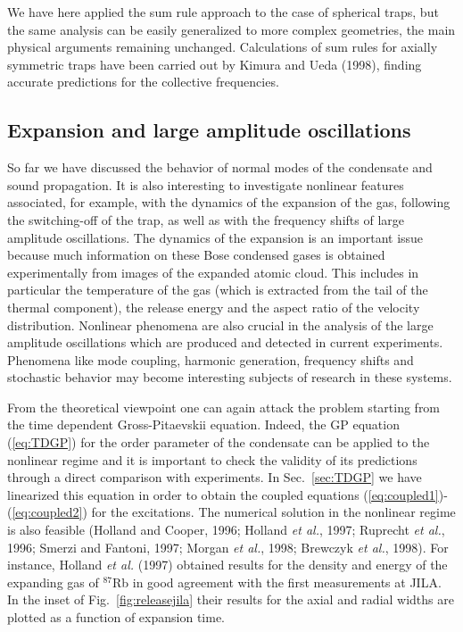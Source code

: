 We have here applied the sum rule approach to the case of spherical traps, 
but the same analysis can be easily generalized to more complex geometries, 
the main physical arguments remaining unchanged. Calculations of sum rules
for axially symmetric traps have been carried out by Kimura and Ueda (1998), 
finding accurate predictions for the collective frequencies.  


\subsection{Expansion and large amplitude oscillations}
\label{sec:nonlinear}

So far we have discussed the behavior of normal modes of the condensate and 
sound propagation. It is also interesting to investigate nonlinear features
associated, for example,  with the dynamics of the expansion of the
gas, following the switching-off of the trap, as well as with the frequency
shifts of large amplitude oscillations. The dynamics of the expansion
is an important issue because much  information on these Bose condensed
gases is obtained experimentally from images of the expanded atomic cloud.
This includes in particular the temperature of the gas (which is extracted
from the tail of the thermal component), the release energy and the aspect
ratio of the velocity distribution. Nonlinear phenomena are also crucial 
in the analysis  of  the large amplitude oscillations which are produced 
and detected in current experiments. Phenomena like mode coupling, 
harmonic generation, frequency shifts and  stochastic behavior may become 
interesting subjects of research in these systems.

 From the theoretical viewpoint one can again attack the problem starting
from the time dependent Gross-Pitaevskii equation. Indeed, the GP equation
(\ref{eq:TDGP}) for the order parameter of the condensate can be applied
to the nonlinear regime and it is important to check the validity of its 
predictions through a direct comparison with experiments. In Sec.~\ref{sec:TDGP}
we have linearized this equation in order to obtain the coupled equations
(\ref{eq:coupled1})-(\ref{eq:coupled2}) for the  excitations.
The numerical solution in the nonlinear regime is also feasible (Holland and
Cooper, 1996; Holland {\it et al.}, 1997; Ruprecht {\it et al.}, 1996; Smerzi
and Fantoni, 1997; Morgan {\it et al.}, 1998;  Brewczyk {\it et al.}, 1998). 
For instance, Holland {\it et al.} (1997) obtained
results  for the density and energy of the expanding gas of $^{87}$Rb in
good agreement with the first measurements at JILA. In the inset of
Fig.~\ref{fig:releasejila}  their results for the axial and radial widths
are plotted as a function of expansion time. 

